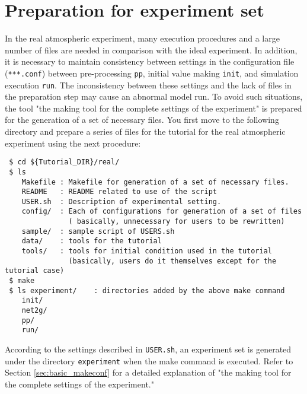 \section{Preparation for experiment set} \label{sec:tutorial_real_prep}

In the real atmospheric experiment,
many execution procedures and a large number of files are needed in comparison with the ideal experiment.
In addition, it is necessary to maintain consistency between settings in the configuration file (\verb|***.conf|)
between pre-processing \verb|pp|, initial value making \verb|init|, and simulation execution \verb|run|.
The inconsistency between these settings and the lack of files in the preparation step may cause an abnormal model run.
To avoid such situations, the tool "the making tool for the complete settings of the experiment"
is prepared for the generation of a set of necessary files.
You first move to the following directory and prepare a series of files for the tutorial for the real atmospheric experiment using the next procedure:
\begin{verbatim}
 $ cd ${Tutorial_DIR}/real/
 $ ls
    Makefile : Makefile for generation of a set of necessary files.
    README   : README related to use of the script
    USER.sh  : Description of experimental setting.
    config/  : Each of configurations for generation of a set of files
               ( basically, unnecessary for users to be rewritten)
    sample/  : sample script of USERS.sh
    data/    : tools for the tutorial
    tools/   : tools for initial condition used in the tutorial 
               (basically, users do it themselves except for the tutorial case)
 $ make
 $ ls experiment/    : directories added by the above make command
    init/
    net2g/
    pp/
    run/
\end{verbatim}

According to the settings described in \verb|USER.sh|,
an experiment set is generated under the directory \verb|experiment| when the make command is executed.
Refer to Section \ref{sec:basic_makeconf} for a detailed explanation of "the making tool for the complete settings of the experiment."

